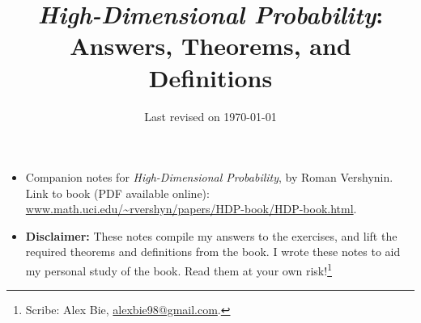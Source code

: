 \documentclass[10pt, oneside]{article}
\begin{document}
\title{\textit{High-Dimensional Probability}: Answers, Theorems, and Definitions}
\author{}
\date{\vspace{-3ex}Last revised on \today}

\maketitle
\vspace{-10pt}

\begin{itemize}
\item Companion notes for \textit{High-Dimensional Probability}, by Roman Vershynin. Link to book (PDF available online): \url{www.math.uci.edu/~rvershyn/papers/HDP-book/HDP-book.html}.
\item \textbf{Disclaimer:} These notes compile my answers to the exercises, and lift the required theorems and definitions from the book. I wrote these notes to aid my personal study of the book. 
Read them at your own risk!\footnote{Scribe: Alex Bie, \url{alexbie98@gmail.com}.}
\end{itemize}

\setcounter{section}{-1}
\tableofcontents

\newpage






\end{document}
